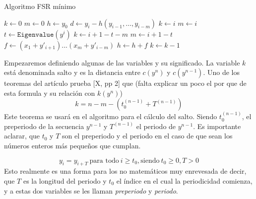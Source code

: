 \begin{algorithm}
\caption{Algoritmo FSR mínimo}\label{alg:three}
$k \gets 0$\;
$m \gets 0$\;
$h \gets y_0$\;
 {
    $d \gets y_i - h(y_{i-1},\dots,y_{i-m})$\;
     {
     {
        $k \gets i$\;
        $m \gets i$\;
    }
     {
        $t \gets \texttt{Eigenvalue$(y^{i})$}$\;
         {
            $k \gets i + 1 - t - m$\;
            $m \gets i + 1 - t$\;
        }
    }
    $f \gets (x_{1} + y'_{i+1})...(x_m+y'_{i-m})$\;
    $h \gets h + f$\;
    }
    $k \gets k - 1$\;
}
\end{algorithm}

Empezaremos definiendo algunas de las variables y su significado. La variable $k$ está denominada salto y es la distancia entre $c(y^{n})$ y $c(y^{n-1})$. Uno de los teoremas del artículo prueba [X, pp 2] que (falta explicar un poco el por que de esta formula y su relación con $k(y^n)$)
\[k = n - m - (t^{(n-1)}_0 + T^{(n - 1)})\]
Este teorema se usará en el algoritmo para el cálculo del salto. Siendo $t_0^{(n - 1)}$, el preperiodo de la secuencia $y^{n-1}$ y $T^{(n - 1)}$ el periodo de $y^{n-1}$. Es importante aclarar, que $t_0$ y $T$ son el preperiodo y el periodo en el caso de que sean los números enteros más pequeños que cumplan.

\[y_i = y_{i+T} \ \text{para todo} \ i \geq t_0, \text{siendo} \  t_0 \geq 0, T > 0\]
Esto realmente es una forma para los no matemáticos muy enrevesada de decir, que $T$ es la longitud del periodo y $t_0$ el índice en el cual la periodicidad comienza, y a estas dos variables se les llaman \textit{preperiodo} y \textit{periodo}. \\\\

